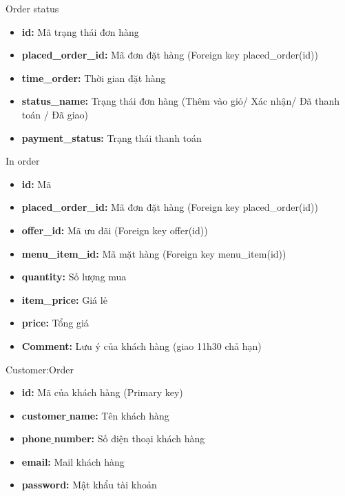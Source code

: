 \documentclass[aspectratio=43,xcolor=dvipsnames]{beamer}
\begin{document}
	\begin{frame}{Order status}
		\begin{itemize}
			\item \textbf{id:} Mã trạng thái đơn hàng
			\item \textbf{placed\_order\_id:} Mã đơn đặt hàng (Foreign key placed\_order(id))
			\item \textbf{time\_order:} Thời gian đặt hàng
			\item \textbf{status\_name:} Trạng thái đơn hàng (Thêm vào giỏ/ Xác nhận/ Đã thanh toán / Đã giao)
			\item \textbf{payment\_status:} Trạng thái thanh toán
		\end{itemize}
	\end{frame}
	
	\begin{frame}{In order}
		\begin{itemize}
			\item \textbf{id:} Mã
			\item \textbf{placed\_order\_id:} Mã đơn đặt hàng (Foreign key placed\_order(id))
			\item \textbf{offer\_id:} Mã ưu đãi (Foreign key offer(id))
			\item \textbf{menu\_item\_id:} Mã mặt hàng (Foreign key menu\_item(id))
			\item \textbf{quantity:} Số lượng mua
			\item \textbf{item\_price:} Giá lẻ
			\item \textbf{price:} Tổng giá
			\item \textbf{Comment:} Lưu ý của khách hàng (giao 11h30 chả hạn)
		\end{itemize}
	\end{frame}
	
	\begin{frame}{Customer:Order}
		\begin{itemize}
			\item \textbf{id:} Mã của khách hàng (Primary key)
			\item \textbf{customer$\_$name:} Tên khách hàng
			\item \textbf{phone$\_$number:} Số điện thoại khách hàng
			\item \textbf{email:} Mail khách hàng
			\item \textbf{password:} Mật khẩu tài khoản
		\end{itemize}
	\end{frame}
	
\end{document}

